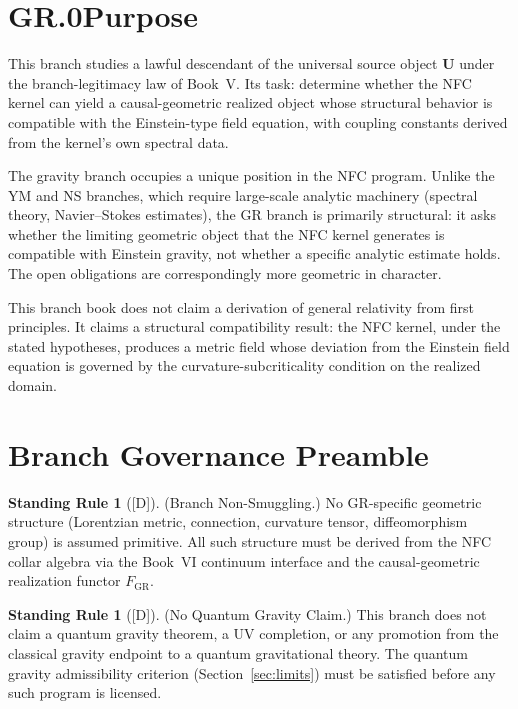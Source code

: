 \documentclass[12pt,oneside]{amsbook}
\theoremstyle{plain}
\theoremstyle{definition}
\newtheorem{standingrule}[theorem]{Standing Rule}
\theoremstyle{remark}
\newcommand{\status}[1]{\textup{[#1]}}
\begin{document}
\section*{GR.0\quad Purpose}

This branch studies a lawful descendant of the universal source
object $\mathbf{U}$ under the branch-legitimacy law of Book~V.
Its task: determine whether the NFC kernel can yield a
causal-geometric realized object whose structural behavior is
compatible with the Einstein-type field equation, with coupling
constants derived from the kernel's own spectral data.

The gravity branch occupies a unique position in the NFC program.
Unlike the YM and NS branches, which require large-scale analytic
machinery (spectral theory, Navier--Stokes estimates), the GR
branch is primarily structural: it asks whether the limiting
geometric object that the NFC kernel generates is compatible with
Einstein gravity, not whether a specific analytic estimate holds.
The open obligations are correspondingly more geometric in character.

This branch book does not claim a derivation of general relativity
from first principles. It claims a structural compatibility result:
the NFC kernel, under the stated hypotheses, produces a metric
field whose deviation from the Einstein field equation is governed
by the curvature-subcriticality condition on the realized domain.

\section{Branch Governance Preamble}
\label{sec:governance}

\begin{standingrule}[\status{D}]\label{sr:gr-no-smuggling}
\textup{(Branch Non-Smuggling.)} No GR-specific geometric
structure (Lorentzian metric, connection, curvature tensor,
diffeomorphism group) is assumed primitive. All such structure
must be derived from the NFC collar algebra via the Book~VI
continuum interface and the causal-geometric realization functor
$F_{\mathrm{GR}}$.
\end{standingrule}

\begin{standingrule}[\status{D}]\label{sr:gr-no-QG}
\textup{(No Quantum Gravity Claim.)} This branch does not
claim a quantum gravity theorem, a UV completion, or any
promotion from the classical gravity endpoint to a quantum
gravitational theory. The quantum gravity admissibility
criterion (Section~\ref{sec:limits}) must be satisfied before
any such program is licensed.
\end{standingrule}
\end{document}
